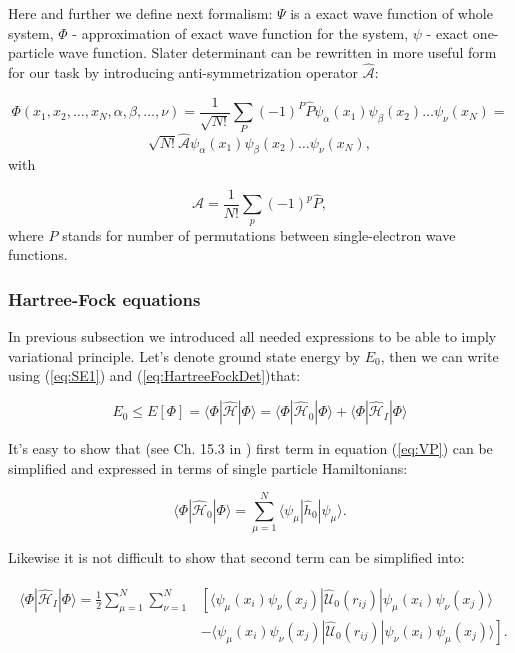 \documentclass[10pt]{article}
\newcommand*{\hatH}{\hat{\mathcal{H}}}
\newcommand*{\hatU}{\hat{\mathcal{U}}}
\newcommand*{\hatA}{\hat{\mathcal{A}}}
\begin{document}
Here and further we define next formalism:  $\Psi$ is a exact wave function of whole system, $\Phi$ - approximation of exact wave function for the system, $\psi$ - exact one-particle wave function. Slater determinant can be rewritten in more useful form for our task by introducing anti-symmetrization operator $\hatA$:

\[
 \Phi(x_1,x_2,\dots,x_N,\alpha,\beta,\dots,\nu) = \frac{1}{\sqrt{N!}}\sum_{P} (-1)^P\hat{P}\psi_{\alpha}(x_1)
    \psi_{\beta}(x_2)\dots\psi_{\nu}(x_N)=
\]
\[ 
    \sqrt{N!}\hatA\psi_{\alpha}(x_1)
    \psi_{\beta}(x_2)\dots\psi_{\nu}(x_N),
\]
with 

\begin{equation}
  \hatA = \frac{1}{N!}\sum_{p} (-1)^p\hat{P},
\label{antiSymmetryOperator}
\end{equation}
where $P$ stands for number of permutations between single-electron wave functions.


\subsubsection{Hartree-Fock equations}
In previous subsection we introduced all needed expressions to be able to imply variational principle. Let's denote ground state energy by $E_0$, then we can write using (\ref{eq:SE1}) and (\ref{eq:HartreeFockDet})that:
 
\begin{equation}\label{eq:VP}
E_0 \le E[\Phi] = \langle \Phi|\hatH|\Phi\rangle = \langle \Phi|\hatH_0|\Phi\rangle + \langle \Phi|\hatH_I|\Phi\rangle
\end{equation}

It's easy to show that (see Ch. 15.3 in \cite{one}) first term in equation (\ref{eq:VP}) can be simplified and expressed in terms of single particle Hamiltonians:

\begin{equation}
\langle \Phi|\hatH_0|\Phi\rangle  = \sum_{\mu=1}^N \langle \psi_{\mu} | \hat{h}_0 | \psi_{\mu} \rangle.
\label{eq:fun1}
\end{equation}

Likewise it is not difficult to show that second term can be simplified into:

\begin{align}
\begin{split}
  \langle \Phi|\hatH_I|\Phi\rangle 
  = \frac{1}{2}\sum_{\mu=1}^N\sum_{\nu=1}^N
    &\left[ \langle \psi_{\mu}(x_i)\psi_{\nu}(x_j)|\hatU_{0}(r_{ij})|\psi_{\mu}(x_i)\psi_{\nu}(x_j)\rangle
    \right.
\label{eq:fun2}\\
  &\left.
  - \langle \psi_{\mu}(x_i)\psi_{\nu}(x_j)
  |\hatU_{0}(r_{ij})|\psi_{\nu}(x_i)\psi_{\mu}(x_j)\rangle
  \right]. 
\end{split}
\end{align}
\end{document}
